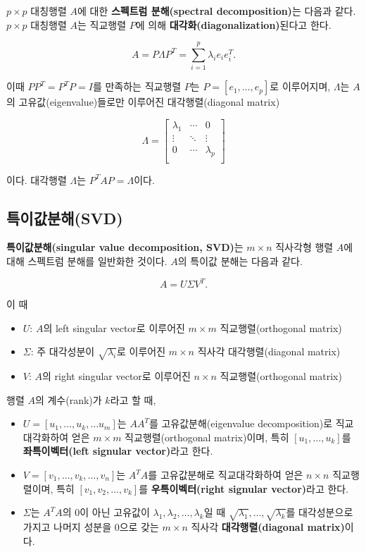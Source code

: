 \documentclass[b5paper,]{scrbook}
\theoremstyle{plain}
\theoremstyle{definition}
\numberwithin{equation}{section}
\begin{document}
\(p\times p\) 대칭행렬 \(A\)에 대한 \textbf{스펙트럼 분해(spectral decomposition)}는 다음과 같다. \(p\times p\) 대칭행렬 \(A\)는 직교행렬 \(P\)에 의해 \textbf{대각화(diagonalization)}된다고 한다.

\[A=P\Lambda P^{T}=\sum_{i=1}^{p}\lambda_{i}e_{i}e_{i}^{T}.\]

이때 \(PP^{T}=P^{T}P=I\)를 만족하는 직교행렬 \(P\)는 \(P=[e_{1},\ldots , e_{p}]\)로 이루어지며, \(\Lambda\)는 \(A\)의 고유값(eigenvalue)들로만 이루어진 대각행렬(diagonal matrix)

\[
\Lambda=
\begin{bmatrix}
\lambda_{1} & \cdots & 0\\
\vdots & \ddots & \vdots\\
0 & \cdots & \lambda_{p}\\
\end{bmatrix}
\]

이다. 대각행렬 \(\Lambda\)는 \(P^{T}AP=\Lambda\)이다.

\hypertarget{svd}{%
\subsection{특이값분해(SVD)}\label{svd}}

\textbf{특이값분해(singular value decomposition, SVD)}는 \(m\times n\) 직사각형 행렬 \(A\)에 대해 스펙트럼 분해를 일반화한 것이다.
\(A\)의 특이값 분해는 다음과 같다.

\[A=U\Sigma V^{T}.\]

이 때

\begin{itemize}
\item
  \(U\): \(A\)의 left singular vector로 이루어진 \(m\times m\) 직교행렬(orthogonal matrix)
\item
  \(\Sigma\): 주 대각성분이 \(\sqrt{\lambda_{i}}\)로 이루어진 \(m\times n\) 직사각 대각행렬(diagonal matrix)
\item
  \(V\): \(A\)의 right singular vector로 이루어진 \(n\times n\) 직교행렬(orthogonal matrix)
\end{itemize}

행렬 \(A\)의 계수(rank)가 \(k\)라고 할 때,

\begin{itemize}
\item
  \(U=[u_{1},\ldots , u_{k}, \ldots u_{m}]\)는 \(AA^{T}\)를 고유값분해(eigenvalue decomposition)로 직교대각화하여 얻은 \(m\times m\) 직교행렬(orthogonal matrix)이며, 특히 \([u_{1},\ldots, u_{k}]\)를 \textbf{좌특이벡터(left signular vector)}라고 한다.
\item
  \(V=[v_{1},\ldots ,v_{k},\ldots , v_{n}]\)는 \(A^{T}A\)를 고유값분해로 직교대각화하여 얻은 \(n\times n\) 직교행렬이며, 특히 \([v_{1},v_{2},\ldots ,v_{k}]\)를 \textbf{우특이벡터(right signular vector)}라고 한다.
\item
  \(\Sigma\)는 \(A^{T}A\)의 0이 아닌 고유값이 \(\lambda_{1},\lambda_{2},\ldots , \lambda_{k}\)일 때 \(\sqrt{\lambda_{1}},\ldots, \sqrt{\lambda_{k}}\)를 대각성분으로 가지고 나머지 성분을 0으로 갖는 \(m\times n\) 직사각 \textbf{대각행렬(diagonal matrix)}이다.
\end{itemize}
\end{document}
